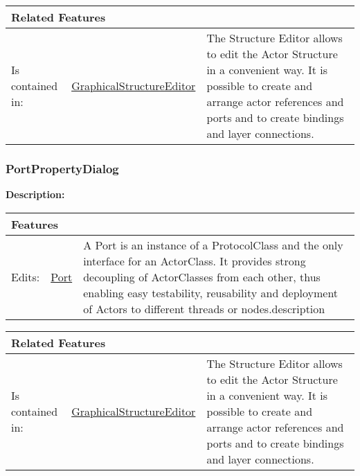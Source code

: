 			\begingroup
			\renewcommand{\arraystretch}{1.8} %
			\begin{longtable}{p{2.5cm}|p{4cm} p{}}
				\multicolumn{2}{l}{\textbf{\large Related Features}} & \\
				\hline
			Is contained in: & \tabitem \hyperlink{ref:GraphicalStructureEditor}{GraphicalStructureEditor}  & The Structure Editor allows to edit the Actor Structure in a convenient way. It is possible to create and arrange actor references and ports and to create bindings and layer connections.\\
			\hline
			\end{longtable}
			\endgroup
			
			
			
		\vspace{\baselineskip}
		\vspace{\baselineskip}
		\vspace{\baselineskip}
		
		\subsubsection{\huge PortPropertyDialog}
			\hypertarget{ref:PortPropertyDialog}{}
			
			\textbf{Description:} 
			
			
			\begingroup
			\renewcommand{\arraystretch}{1.8} %
			\begin{longtable}{p{2.5cm}|p{4cm} p{}}
				\multicolumn{2}{l}{\textbf{\large Features}} & \\
				\hline
			Edits: & \tabitem \hyperlink{ref:Port}{Port}  & A Port is an instance of a ProtocolClass and the only interface for an ActorClass. It provides strong decoupling of ActorClasses from each other, thus enabling easy testability, reusability and deployment of Actors to different threads or nodes.description \\
			\hline
			\end{longtable}
			\endgroup
			
			\begingroup
			\renewcommand{\arraystretch}{1.8} %
			\begin{longtable}{p{2.5cm}|p{4cm} p{}}
				\multicolumn{2}{l}{\textbf{\large Related Features}} & \\
				\hline
			Is contained in: & \tabitem \hyperlink{ref:GraphicalStructureEditor}{GraphicalStructureEditor}  & The Structure Editor allows to edit the Actor Structure in a convenient way. It is possible to create and arrange actor references and ports and to create bindings and layer connections.\\
			\hline
			\end{longtable}
			\endgroup
			
